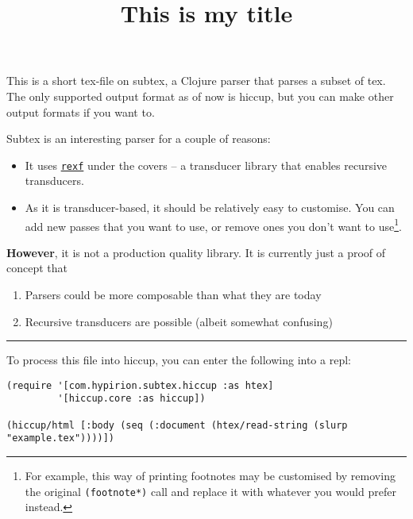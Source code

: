 \documentclass{article}
\title{This is my title}
\newcommand{\printfootnotes}{} %
\begin{document}
\maketitle
This is a short tex-file on subtex, a Clojure parser that parses a subset of
tex. The only supported output format as of now is hiccup, but you can make
other output formats if you want to.

Subtex is an interesting parser for a couple of reasons:

\begin{itemize}
\item It uses \href{https://github.com/hyPiRion/rexf}{\texttt{rexf}} under the
  covers – a transducer library that enables recursive transducers.
\item As it is transducer-based, it should be relatively easy to customise. You
  can add new passes that you want to use, or remove ones you don't want to
  use\footnote{For example, this way of printing footnotes may be customised by
  removing the original \texttt{(footnote*)} call and replace it with whatever
  you would prefer instead.}.
\end{itemize}

\textbf{However}, it is not a production quality library. It is currently just a
  proof of concept that
\begin{enumerate}
\item Parsers could be more composable than what they are today
\item Recursive transducers are possible (albeit somewhat confusing)
\end{enumerate}

\hrule

To process this file into hiccup, you can enter the following into a repl:
\begin{verbatim}
(require '[com.hypirion.subtex.hiccup :as htex]
         '[hiccup.core :as hiccup])

(hiccup/html [:body (seq (:document (htex/read-string (slurp "example.tex"))))])
\end{verbatim}

\printfootnotes
\end{document}
